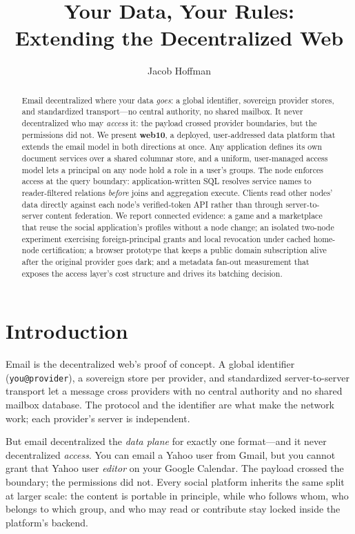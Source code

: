 \documentclass[sigconf, nonacm]{acmart}
\title{Your Data, Your Rules: \\ Extending the Decentralized Web}
\author{Jacob Hoffman}
\affiliation{\institution{web10 Inc.}\country{}}
\begin{document}
\begin{abstract}
Email decentralized where your data \emph{goes}: a global identifier,
sovereign provider stores, and standardized transport---no central authority,
no shared mailbox. It never decentralized who may \emph{access} it: the
payload crossed provider boundaries, but the permissions did not. We present
\textbf{web10}, a deployed, user-addressed data platform that extends the
email model in both directions at once. Any application defines its own
document services over a shared columnar store, and a uniform, user-managed
access model lets a principal on any node hold a role in a user's groups.
The node enforces access at the query boundary: application-written SQL
resolves service names to reader-filtered relations \emph{before} joins and
aggregation execute. Clients read other nodes' data directly against each
node's verified-token API rather than through server-to-server content
federation. We report connected evidence: a game and a marketplace that reuse
the social application's profiles without a node change; an isolated
two-node experiment exercising foreign-principal grants and local revocation
under cached home-node certification; a browser prototype that keeps a public
domain subscription alive after the original provider goes dark; and a
metadata fan-out measurement that exposes the access layer's cost structure
and drives its batching decision.
\end{abstract}

\maketitle
\section{Introduction}
\label{sec:intro}

Email is the decentralized web's proof of concept. A global identifier
(\texttt{you@provider}), a sovereign store per provider, and standardized
server-to-server transport let a message cross providers with no central
authority and no shared mailbox database. The protocol and the identifier are
what make the network work; each provider's server is independent.

But email decentralized the \emph{data plane} for exactly one format---and it
never decentralized \emph{access}. You can email a Yahoo user from Gmail, but
you cannot grant that Yahoo user \emph{editor} on your Google Calendar. The
payload crossed the boundary; the permissions did not. Every social platform
inherits the same split at larger scale: the content is portable in principle,
while who follows whom, who belongs to which group, and who may read or
contribute stay locked inside the platform's backend.
\end{document}
